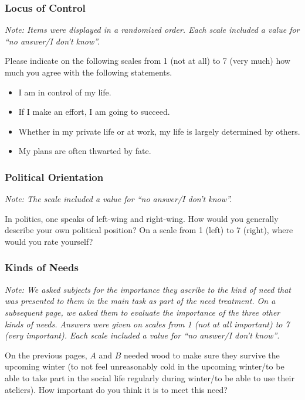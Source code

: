 \documentclass[egregdoesnotlikesansseriftitles]{scrartcl}
\begin{document}
\subsubsection*{Locus of Control}
\noindent\textit{Note: Items were displayed in a randomized order. Each scale included a value for ``no answer/I don't know''.}\vspace{1ex}

\noindent Please indicate on the following scales from 1 (not at all) to 7 (very much) how much you agree with the following statements.
\begin{itemize}
   \item I am in control of my life.
   \item If I make an effort, I am going to succeed.
   \item Whether in my private life or at work, my life is largely determined by others.
   \item My plans are often thwarted by fate.
\end{itemize}

\subsubsection*{Political Orientation}
\noindent\textit{Note: The scale included a value for ``no answer/I don't know''.}\vspace{1ex}

\noindent In politics, one speaks of left-wing and right-wing.
How would you generally describe your own political position?
On a scale from 1 (left) to 7 (right), where would you rate yourself?

\subsubsection*{Kinds of Needs}
\noindent\textit{Note: We asked subjects for the importance they ascribe to the kind of need that was presented to them in the main task as part of the need treatment.
On a subsequent page, we asked them to evaluate the importance of the three other kinds of needs.
Answers were given on scales from 1 (not at all important) to 7 (very important).
Each scale included a value for ``no answer/I don't know''}.\vspace{1ex}

\noindent On the previous pages, $A$ and $B$ needed wood to make sure they survive the upcoming winter (to not feel unreasonably cold in the upcoming winter/to be able to take part in the social life regularly during winter/to be able to use their ateliers).
How important do you think it is to meet this need?\vspace{1ex}
\end{document}
